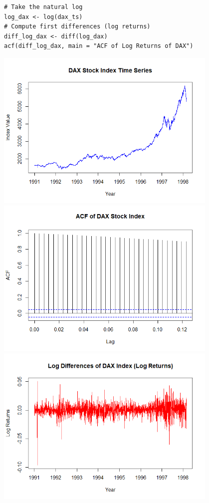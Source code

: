 \documentclass[12pt]{article}
\begin{document}
\begin{enumerate}
\begin{enumerate}
\begin{verbatim}
# Take the natural log
log_dax <- log(dax_ts)
# Compute first differences (log returns)
diff_log_dax <- diff(log_dax)
acf(diff_log_dax, main = "ACF of Log Returns of DAX")
    \end{verbatim}
    \begin{center}
        \includegraphics[width=0.8\textwidth]{Rplot03.png}
        \includegraphics[width=0.8\textwidth]{Rplot04.png}
        \includegraphics[width=0.8\textwidth]{Rplot05.png}

\end{center}
\end{enumerate}
\end{enumerate}
\end{document}
